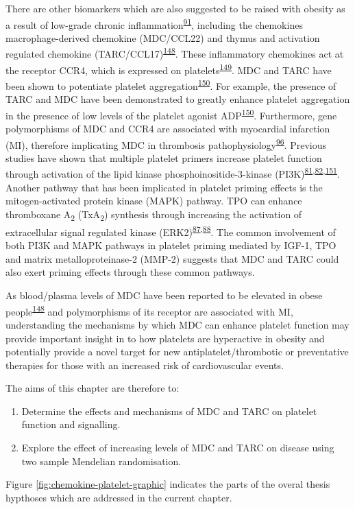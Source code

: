 \documentclass[11pt,twoside]{bristolthesis}
\providecommand{\tightlist}{%
  \setlength{\itemsep}{0pt}\setlength{\parskip}{0pt}}
\begin{document}
There are other biomarkers which are also suggested to be raised with obesity as a result of low-grade chronic inflammation\textsuperscript{\protect\hyperlink{ref-Esser2014}{91}}, including the chemokines macrophage-derived chemokine (MDC/CCL22) and thymus and activation regulated chemokine (TARC/CCL17)\textsuperscript{\protect\hyperlink{ref-Safa2016}{148}}. These inflammatory chemokines act at the receptor CCR4, which is expressed on platelets\textsuperscript{\protect\hyperlink{ref-Clemetson2000}{149}}. MDC and TARC have been shown to potentiate platelet aggregation\textsuperscript{\protect\hyperlink{ref-Gear2001}{150}}. For example, the presence of TARC and MDC have been demonstrated to greatly enhance platelet aggregation in the presence of low levels of the platelet agonist ADP\textsuperscript{\protect\hyperlink{ref-Gear2001}{150}}. Furthermore, gene polymorphisms of MDC and CCR4 are associated with myocardial infarction (MI), therefore implicating MDC in thrombosis pathophysiology\textsuperscript{\protect\hyperlink{ref-Noori2018}{96}}. Previous studies have shown that multiple platelet primers increase platelet function through activation of the lipid kinase phosphoinositide-3-kinase (PI3K)\textsuperscript{\protect\hyperlink{ref-Blair2015}{81},\protect\hyperlink{ref-Pasquet2000}{82},\protect\hyperlink{ref-Falcinelli2005}{151}}. Another pathway that has been implicated in platelet priming effects is the mitogen-activated protein kinase (MAPK) pathway. TPO can enhance thromboxane A\textsubscript{2} (TxA\textsubscript{2}) synthesis through increasing the activation of extracellular signal regulated kinase (ERK2)\textsuperscript{\protect\hyperlink{ref-Ezumi1998}{87},\protect\hyperlink{ref-VanWilligen2000}{88}}. The common involvement of both PI3K and MAPK pathways in platelet priming mediated by IGF-1, TPO and matrix metalloproteinase-2 (MMP-2) suggests that MDC and TARC could also exert priming effects through these common pathways.

As blood/plasma levels of MDC have been reported to be elevated in obese people\textsuperscript{\protect\hyperlink{ref-Safa2016}{148}} and polymorphisms of its receptor are associated with MI, understanding the mechanisms by which MDC can enhance platelet function may provide important insight in to how platelets are hyperactive in obesity and potentially provide a novel target for new antiplatelet/thrombotic or preventative therapies for those with an increased risk of cardiovascular events.

The aims of this chapter are therefore to:
\begin{enumerate}
\def\labelenumi{\arabic{enumi})}
\tightlist
\item
  Determine the effects and mechanisms of MDC and TARC on platelet function and signalling.
\item
  Explore the effect of increasing levels of MDC and TARC on disease using two sample Mendelian randomisation.
\end{enumerate}
Figure \ref{fig:chemokine-platelet-graphic} indicates the parts of the overal thesis hypthoses which are addressed in the current chapter.
\end{document}
